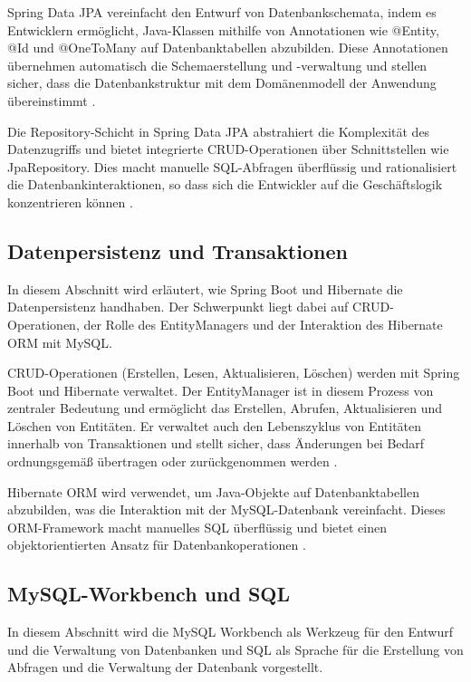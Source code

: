 Spring Data JPA vereinfacht den Entwurf von Datenbankschemata, indem es Entwicklern ermöglicht, Java-Klassen mithilfe von Annotationen wie @Entity, @Id und @OneToMany auf Datenbanktabellen abzubilden. Diese Annotationen übernehmen automatisch die Schemaerstellung und -verwaltung und stellen sicher, dass die Datenbankstruktur mit dem Domänenmodell der Anwendung übereinstimmt \cite{Docs-Spring:o.J, Baeldung:o.J}.

Die Repository-Schicht in Spring Data JPA abstrahiert die Komplexität des Datenzugriffs und bietet integrierte CRUD-Operationen über Schnittstellen wie JpaRepository. Dies macht manuelle SQL-Abfragen überflüssig und rationalisiert die Datenbankinteraktionen, so dass sich die Entwickler auf die Geschäftslogik konzentrieren können \cite{Docs-Spring-JPA-Repo:o.J, Docs-Spring-JPA-QueryMethods:o.J}.

\subsection{Datenpersistenz und Transaktionen}
In diesem Abschnitt wird erläutert, wie Spring Boot und Hibernate die Datenpersistenz handhaben. Der Schwerpunkt liegt dabei auf CRUD-Operationen, der Rolle des EntityManagers und der Interaktion des Hibernate ORM mit MySQL.

CRUD-Operationen (Erstellen, Lesen, Aktualisieren, Löschen) werden mit Spring Boot und Hibernate verwaltet. Der EntityManager ist in diesem Prozess von zentraler Bedeutung und ermöglicht das Erstellen, Abrufen, Aktualisieren und Löschen von Entitäten. Er verwaltet auch den Lebenszyklus von Entitäten innerhalb von Transaktionen und stellt sicher, dass Änderungen bei Bedarf ordnungsgemäß übertragen oder zurückgenommen werden  \cite{Baeldung-EntityManager:2024}.


Hibernate ORM wird verwendet, um Java-Objekte auf Datenbanktabellen abzubilden, was die Interaktion mit der MySQL-Datenbank vereinfacht. Dieses ORM-Framework macht manuelles SQL überflüssig und bietet einen objektorientierten Ansatz für Datenbankoperationen \cite{Hibernate:o.J}.


\subsection{MySQL-Workbench und SQL}
In diesem Abschnitt wird die MySQL Workbench als Werkzeug für den Entwurf und die Verwaltung von Datenbanken und SQL als Sprache für die Erstellung von Abfragen und die Verwaltung der Datenbank vorgestellt.

